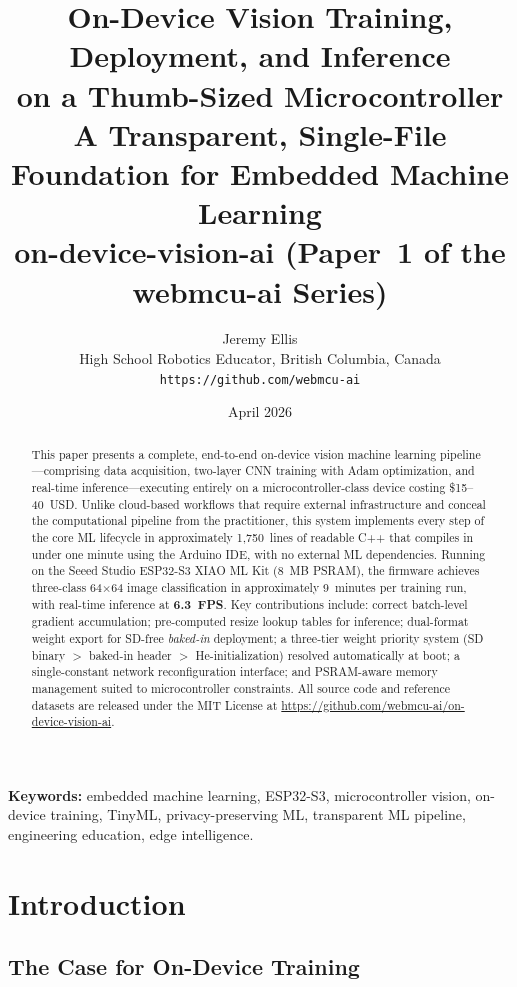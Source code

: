 \documentclass[12pt]{article}
\title{\textbf{On-Device Vision Training, Deployment, and Inference\\
on a Thumb-Sized Microcontroller}\\[0.4em]
{\large A Transparent, Single-File Foundation for Embedded Machine Learning}\\[4pt]
{\large on-device-vision-ai (Paper~1 of the webmcu-ai Series)}}
\author{Jeremy Ellis\\
High School Robotics Educator, British Columbia, Canada\\
\texttt{https://github.com/webmcu-ai}}
\date{April 2026}
\begin{document}
\maketitle

\begin{abstract}
This paper presents a complete, end-to-end on-device vision machine learning
pipeline---comprising data acquisition, two-layer CNN training with Adam
optimization, and real-time inference---executing entirely on a
microcontroller-class device costing \$15--40~USD.
Unlike cloud-based workflows that require external infrastructure and conceal
the computational pipeline from the practitioner, this system implements every
step of the core ML lifecycle in approximately 1,750~lines of readable C++ that
compiles in under one minute using the Arduino IDE, with no external ML
dependencies.
Running on the Seeed Studio ESP32-S3 XIAO ML Kit (8~MB PSRAM), the firmware
achieves three-class 64$\times$64 image classification in approximately
9~minutes per training run, with real-time inference at \textbf{6.3~FPS}.
Key contributions include: correct batch-level gradient accumulation;
pre-computed resize lookup tables for inference; dual-format weight export for
SD-free \emph{baked-in} deployment; a three-tier weight priority system
(SD binary $>$ baked-in header $>$ He-initialization) resolved automatically
at boot; a single-constant network reconfiguration interface; and
PSRAM-aware memory management suited to microcontroller constraints.
All source code and reference datasets are released under the MIT License at
\url{https://github.com/webmcu-ai/on-device-vision-ai}.
\end{abstract}

\textbf{Keywords:} embedded machine learning, ESP32-S3, microcontroller vision,
on-device training, TinyML, privacy-preserving ML, transparent ML pipeline,
engineering education, edge intelligence.

\tableofcontents
\newpage

\section{Introduction}
\label{sec:intro}

\subsection{The Case for On-Device Training}
\label{subsec:motivation}
\end{document}
